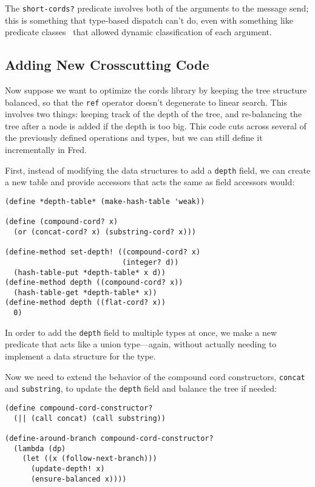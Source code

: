 \documentclass{acm_proc_article-sp}
\newcommand{\code}[1]{\texttt{#1}}
\begin{document}
The \code{short-cords?} predicate involves both of the arguments to
the message send; this is something that type-based dispatch can't do,
even with something like predicate classes~\cite{predicate-classes}
that allowed dynamic classification of each argument.

\subsection{Adding New Crosscutting Code}
\label{around-branch}

Now suppose we want to optimize the cords library by keeping the tree
structure balanced, so that the \code{ref} operator doesn't degenerate
to linear search.  This involves two things: keeping track of the
depth of the tree, and re-balancing the tree after a node is added if
the depth is too big.  This code cuts across several of the previously
defined operations and types, but we can still define it incrementally
in Fred.

First, instead of modifying the data structures to add a \code{depth}
field, we can create a new table and provide accessors that acts the
same as field accessors would:

\begin{verbatim}
(define *depth-table* (make-hash-table 'weak))

(define (compound-cord? x)
  (or (concat-cord? x) (substring-cord? x)))

(define-method set-depth! ((compound-cord? x)
                           (integer? d))
  (hash-table-put *depth-table* x d))
(define-method depth ((compound-cord? x))
  (hash-table-get *depth-table* x))
(define-method depth ((flat-cord? x))
  0)
\end{verbatim}

In order to add the \code{depth} field to multiple types at once, we
make a new predicate that acts like a union type---again, without
actually needing to implement a data structure for the type.

Now we need to extend the behavior of the compound cord constructors,
\code{concat} and \code{substring}, to update the \code{depth} field
and balance the tree if needed:

\begin{verbatim}
(define compound-cord-constructor?
  (|| (call concat) (call substring))

(define-around-branch compound-cord-constructor?
  (lambda (dp)
    (let ((x (follow-next-branch)))
      (update-depth! x)
      (ensure-balanced x))))
\end{verbatim}
\end{document}
